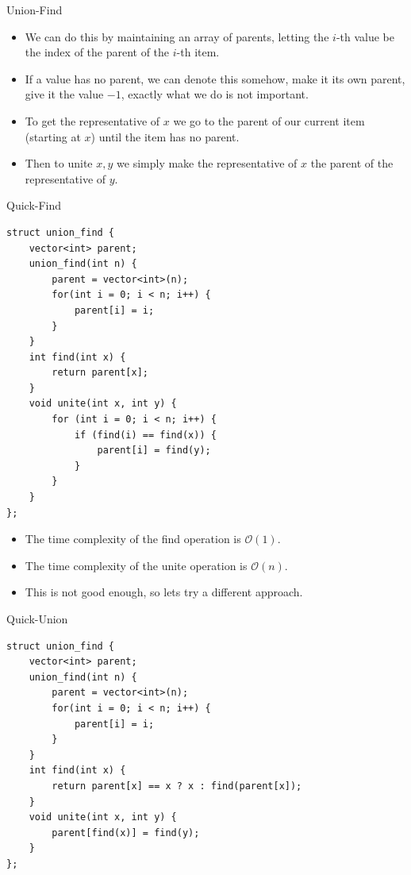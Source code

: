 \documentclass{beamer}
\begin{document}
\begin{frame}[plain]{Union-Find}
    \begin{itemize}
        \item<1-> We can do this by maintaining an array of parents, letting the $i$-th value be the index of the parent of the $i$-th item.
        \item<1-> If a value has no parent, we can denote this somehow, make it its own parent, give it the value $-1$, exactly what we do is not important.
        \item<2-> To get the representative of $x$ we go to the parent of our current item (starting at $x$) until the item has no parent.
        \item<2-> Then to unite $x, y$ we simply make the representative of $x$ the parent of the representative of $y$.
    \end{itemize}
\end{frame}

\begin{frame}{Quick-Find}
    \begin{small}
    \begin{verbatim}
struct union_find {
    vector<int> parent;
    union_find(int n) {
        parent = vector<int>(n);
        for(int i = 0; i < n; i++) {
            parent[i] = i;
        }
    }
    int find(int x) {
        return parent[x];
    }
    void unite(int x, int y) {
        for (int i = 0; i < n; i++) {
            if (find(i) == find(x)) {
                parent[i] = find(y);
            }
        }
    }
};
    \end{verbatim}
    \end{small}
\end{frame}

\begin{frame}
    \begin{itemize}
        \item The time complexity of the find operation is $\mathcal{O}(1)$.
        \item The time complexity of the unite operation is $\mathcal{O}(n)$.
        \item This is not good enough, so lets try a different approach.
    \end{itemize}
\end{frame}

\begin{frame}{Quick-Union}
    \begin{verbatim}
struct union_find {
    vector<int> parent;
    union_find(int n) {
        parent = vector<int>(n);
        for(int i = 0; i < n; i++) {
            parent[i] = i;
        }
    }
    int find(int x) {
        return parent[x] == x ? x : find(parent[x]);
    }
    void unite(int x, int y) {
        parent[find(x)] = find(y);
    }
};
    \end{verbatim}
\end{frame}
\end{document}
